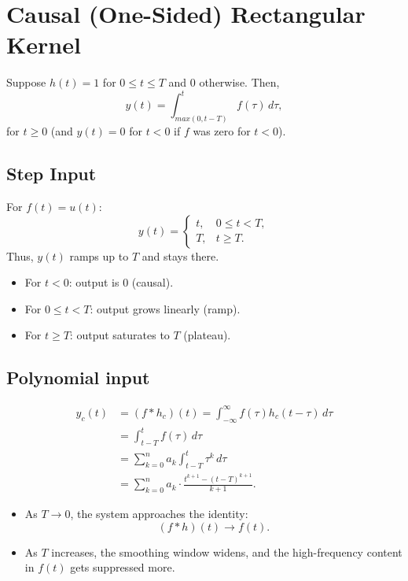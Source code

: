 \documentclass[12pt,a4paper]{report}
\begin{document}
\chapter{Causal (One-Sided) Rectangular Kernel}

Suppose $h(t) = 1$ for $0 \leq t \leq T$ and $0$ otherwise. Then,
\[
y(t) = \int_{max(0,t-T)}^{t} f(\tau)\, d\tau,
\]
for $t \geq 0$ (and $y(t) = 0$ for $t < 0$ if $f$ was zero for $t<0$).

\section{Step Input}
For $f(t) = u(t)$:
\[
y(t) =
\begin{cases}
t, & 0 \leq t < T,\\
T, & t \geq T.
\end{cases}
\]
Thus, $y(t)$ ramps up to $T$ and stays there.
\begin{itemize}
        \item For $t < 0$: output is $0$ (causal).
        \item For $0 \leq t < T$: output grows linearly (ramp).
        \item For $t \geq T$: output saturates to $T$ (plateau).
    \end{itemize}
\section{Polynomial input}
\begin{align*}
y_c(t) &= (f * h_c)(t) = \int_{-\infty}^\infty f(\tau) h_c(t - \tau)\,d\tau \\
&= \int_{t - T}^{t} f(\tau)\,d\tau \\
&= \sum_{k=0}^n a_k \int_{t - T}^{t} \tau^k\,d\tau \\
&= \sum_{k=0}^n a_k \cdot \frac{t^{k + 1} - (t - T)^{k + 1}}{k + 1}.
\end{align*}
\begin{itemize}
\item As $T \to 0$, the system approaches the identity:
    \[
    (f * h)(t) \to f(t).
    \]
    \item As $T$ increases, the smoothing window widens, and the high-frequency content in $f(t)$ gets suppressed more.
    \end{itemize}
\end{document}
